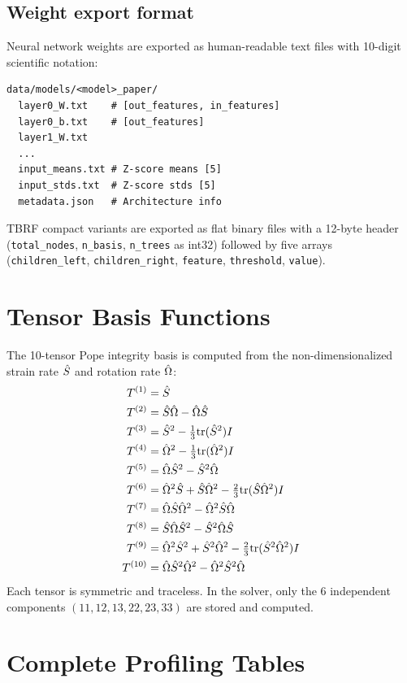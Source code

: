 \subsection{Weight export format}

Neural network weights are exported as human-readable text files with 10-digit scientific notation:
\begin{verbatim}
data/models/<model>_paper/
  layer0_W.txt    # [out_features, in_features]
  layer0_b.txt    # [out_features]
  layer1_W.txt
  ...
  input_means.txt # Z-score means [5]
  input_stds.txt  # Z-score stds [5]
  metadata.json   # Architecture info
\end{verbatim}

TBRF compact variants are exported as flat binary files with a 12-byte header (\texttt{total\_nodes}, \texttt{n\_basis}, \texttt{n\_trees} as int32) followed by five arrays (\texttt{children\_left}, \texttt{children\_right}, \texttt{feature}, \texttt{threshold}, \texttt{value}).

\section{Tensor Basis Functions}
\label{sec:appendix_basis}

The 10-tensor Pope integrity basis \citep{Pope1975} is computed from the non-dimensionalized strain rate $\hat{S}$ and rotation rate $\hat{\Omega}$:
\begin{align}
    T^{(1)} &= \hat{S} \\
    T^{(2)} &= \hat{S}\hat{\Omega} - \hat{\Omega}\hat{S} \\
    T^{(3)} &= \hat{S}^2 - \tfrac{1}{3}\mathrm{tr}(\hat{S}^2)I \\
    T^{(4)} &= \hat{\Omega}^2 - \tfrac{1}{3}\mathrm{tr}(\hat{\Omega}^2)I \\
    T^{(5)} &= \hat{\Omega}\hat{S}^2 - \hat{S}^2\hat{\Omega} \\
    T^{(6)} &= \hat{\Omega}^2\hat{S} + \hat{S}\hat{\Omega}^2 - \tfrac{2}{3}\mathrm{tr}(\hat{S}\hat{\Omega}^2)I \\
    T^{(7)} &= \hat{\Omega}\hat{S}\hat{\Omega}^2 - \hat{\Omega}^2\hat{S}\hat{\Omega} \\
    T^{(8)} &= \hat{S}\hat{\Omega}\hat{S}^2 - \hat{S}^2\hat{\Omega}\hat{S} \\
    T^{(9)} &= \hat{\Omega}^2\hat{S}^2 + \hat{S}^2\hat{\Omega}^2 - \tfrac{2}{3}\mathrm{tr}(\hat{S}^2\hat{\Omega}^2)I \\
    T^{(10)} &= \hat{\Omega}\hat{S}^2\hat{\Omega}^2 - \hat{\Omega}^2\hat{S}^2\hat{\Omega}
\end{align}
Each tensor is symmetric and traceless.
In the solver, only the 6 independent components $(11, 12, 13, 22, 23, 33)$ are stored and computed.

\section{Complete Profiling Tables}
\label{sec:appendix_profiling}


